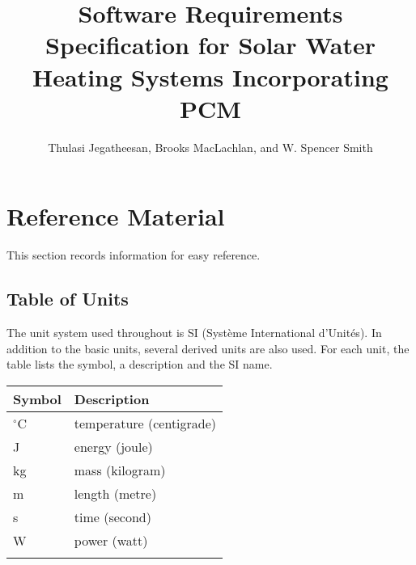 \documentclass[12pt]{article}
\title{Software Requirements Specification for Solar Water Heating Systems Incorporating PCM}
\author{Thulasi Jegatheesan, Brooks MacLachlan, and W. Spencer Smith}
\begin{document}
\maketitle
\tableofcontents
\newpage
\section{Reference Material}
\label{Sec:RefMat}
This section records information for easy reference.
\subsection{Table of Units}
\label{Sec:ToU}
The unit system used throughout is SI (Syst\`{e}me International d'Unit\'{e}s). In addition to the basic units, several derived units are also used. For each unit, the table lists the symbol, a description and the SI name.
\begin{longtable*}{l l}
\toprule
Symbol & Description
\\
\midrule
${}^{\circ}$C & temperature (centigrade)
\\
J & energy (joule)
\\
kg & mass (kilogram)
\\
m & length (metre)
\\
s & time (second)
\\
W & power (watt)
\\
\bottomrule
\label{Table:ToU}
\end{longtable*}
\end{document}
